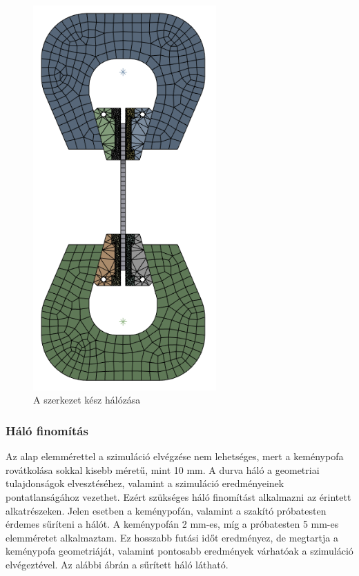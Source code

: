 \documentclass[12pt,a4paper,oneside]{report}
\begin{document}
\begin{figure}[H]
    \centering
    \includegraphics[width=7cm]{figures/mesh_2.png}
    \caption{A szerkezet kész hálózása}
    \label{Fig:mesh_2}
\end{figure}

\subsubsection{Háló finomítás}
Az alap elemmérettel a szimuláció elvégzése nem lehetséges, mert a keménypofa rovátkolása sokkal kisebb méretű, mint 10 mm. A durva háló a geometriai tulajdonságok elvesztéséhez, valamint a szimuláció eredményeinek pontatlanságához vezethet. Ezért szükséges háló finomítást alkalmazni az érintett alkatrészeken. Jelen esetben a keménypofán, valamint a szakító próbatesten érdemes sűríteni a hálót. A keménypofán 2 mm-es, míg a próbatesten 5 mm-es elemméretet alkalmaztam. Ez hosszabb futási időt eredményez, de megtartja a keménypofa geometriáját, valamint pontosabb eredmények várhatóak a szimuláció elvégeztével. Az alábbi ábrán a sűrített háló látható.
\end{document}
